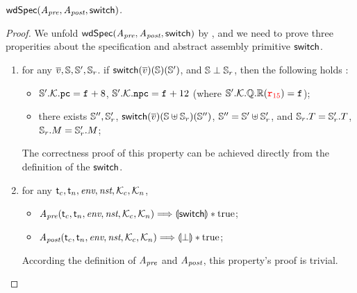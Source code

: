 \begin{lemma}
    \em
    \label{lemma:wdspec}
    $\textsf{wdSpec}({\textit{A}_\textit{pre}}, {\textit{A}_\textit{post}}, {\mathsf{switch}})$. 
\end{lemma}
\begin{proof}
    We unfold $\textsf{wdSpec}({\textit{A}_\textit{pre}}, {\textit{A}_\textit{post}}, {\mathsf{switch}})$ by \Def{\ref{def:well-defined specification}}, 
    and we need to prove three properities about the specification and 
    abstract assembly primitive $\mathsf{switch}$. 
    \begin{enumerate}
        \item 
        for any $\overline{v}, \mathbb{S}, \mathbb{S}', \mathbb{S}_r$. 
            if $\mathsf{switch}(\overline{v})(\mathbb{S})(\mathbb{S}')$, and 
            $\mathbb{S} \perp \mathbb{S}_r$, 
            then the following holds : 
            \begin{itemize}
                \item $\mathbb{S}'.\mathcal{K}.\texttt{pc} = \texttt{f}_{} + 8$, 
                    $\mathbb{S}'.\mathcal{K}.\texttt{npc} = \texttt{f}_{} + 12$
                    (where $\mathbb{S}'.\mathcal{K}.\mathbb{Q}.\mathbb{R}
                        ({\color{red} \texttt{r}_{15}}) = \texttt{f}_{}$);
                \item there exists $\mathbb{S}'', \mathbb{S}_r'$, 
                    $\mathsf{switch}(\overline{v})(\mathbb{S} \uplus \mathbb{S}_r) 
                        (\mathbb{S}'')$, $\mathbb{S}'' = \mathbb{S}' \uplus \mathbb{S}_r'$, 
                    and $\mathbb{S}_r.T = \mathbb{S}_r'.T$, 
                    $\mathbb{S}_r.M = \mathbb{S}_r'.M$; 
            \end{itemize}
        \vspace*{0.3em}
        The correctness proof of this property can be achieved directly from the definition 
        of the $\mathsf{switch}$. 
        \vspace*{0.5em}
        
        \item for any $\textsf{t}_c, \textsf{t}_n, \textit{env}, \textit{nst}, \mathcal{K}_c, \mathcal{K}_n$,
            \begin{itemize}
                \item $\textit{A}_\textit{pre}(\textsf{t}_c, \textsf{t}_n, \textit{env}, \textit{nst}, \mathcal{K}_c, \mathcal{K}_n) 
                    \Longrightarrow \llparenthesis {\mathsf{switch}} \rrparenthesis * \text{true}$; 
                \item $\textit{A}_\textit{post}(\textsf{t}_c, \textsf{t}_n, \textit{env}, \textit{nst}, \mathcal{K}_c, \mathcal{K}_n) 
                    \Longrightarrow \llparenthesis {\perp} \rrparenthesis * \text{true}$; 
            \end{itemize}   
        \vspace*{0.3em}
        According the definition of $\textit{A}_\textit{pre}$ and $\textit{A}_\textit{post}$, 
        this property's proof is trivial.
        \vspace*{0.5em}
        

\end{enumerate}
\end{proof}
